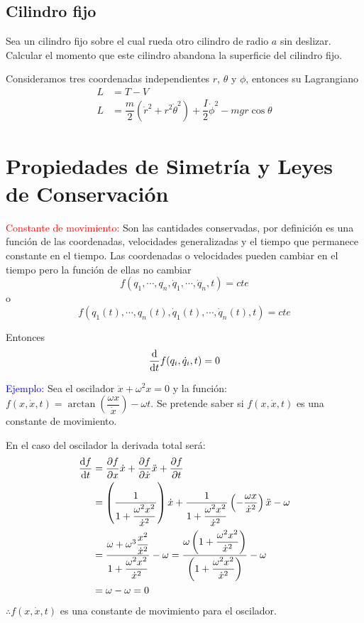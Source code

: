 \documentclass[../main]{subfiles}
\begin{document}
\subsection{Cilindro fijo}

Sea un cilindro fijo sobre el cual rueda otro cilindro de radio $a$ sin deslizar. Calcular el momento que este cilindro abandona la superficie del cilindro fijo.

Consideramos tres coordenadas independientes $r$, $\theta$ y $\phi$, entonces su Lagrangiano
\begin{equation}
    \begin{split}
        L&=T-V \\
        L&=\dfrac{m}{2}(\dot{r}^2+r^2\dot{\theta}^2)+\dfrac{I}{2}\dot{\phi}^2-mgr \cos \theta
    \end{split}
\end{equation}


\section{Propiedades de Simetría y Leyes de Conservación}

\textcolor{red}{Constante de movimiento:} Son las cantidades conservadas, por definición es una función de las coordenadas, velocidades generalizadas y el tiempo que permanece constante en el tiempo. Las coordenadas o velocidades pueden cambiar en el tiempo pero la función de ellas no cambiar
\begin{equation}
    f(q_1, \cdots, q_n, \dot{q}_1, \cdots, \dot{q}_n, t)=cte
\end{equation}
o
\begin{equation}
    f\left(q_1(t), \cdots, q_n(t), \dot{q}_1(t), \cdots, \dot{q}_n(t), t\right)=cte
\end{equation}

Entonces 
\begin{equation}
    \dv{}{t}f(q_i, \dot{q}_i, t)=0
\end{equation}

\textcolor{blue}{Ejemplo:} Sea el oscilador $\ddot{x}+\omega^2 x=0$ y la función: $f(x, \dot{x}, t)=\arctan\left(\dfrac{\omega x}{\dot{x}}\right)-\omega t$. Se pretende saber si $f(x, \dot{x}, t)$ es una constante de movimiento.

En el caso del oscilador la derivada total será:
\begin{align*}
    \dv{f}{t}&=\pdv{f}{x}\dot{x}+\pdv{f}{\dot{x}}\ddot{x}+\pdv{f}{t}\\
    &=\left(\dfrac{1}{1+\dfrac{\omega^2 x^2}{\dot{x}^2}}\right)\dot{x}+\dfrac{1}{1+\dfrac{\omega^2 x^2}{\dot{x}^2}}\left(-\dfrac{\omega x}{\dot{x}^2}\right)\ddot{x}-\omega \\
    &=\dfrac{\omega+\omega^3 \dfrac{x^2}{\dot{x}^2}}{1+\dfrac{\omega^2 x^2}{\dot{x}^2}}-\omega=\dfrac{\omega\left(1+\dfrac{\omega^2 x^2}{\dot{x}^2}\right)}{\left(1+\dfrac{\omega^2 x^2}{\dot{x}^2}\right)}-\omega \\
    &=\omega-\omega=0
\end{align*}
$\therefore f(x, \dot{x}, t)$ es una constante de movimiento para el oscilador.
\end{document}
